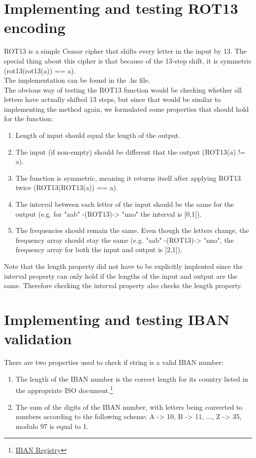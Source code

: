 \documentclass[a4paper]{article}
\begin{document}
\section{Implementing and testing ROT13 encoding}
ROT13 is a simple Ceasar cipher that shifts every letter in the input by 13. The special thing about this cipher is that because of the 13-step shift, it is symmetric (rot13(rot13(a)) == a).\\
The implementation can be found in the .hs file.\\
The obvious way of testing the ROT13 function would be checking whether all letters have actually shifted 13 steps, but since that would be similar to implementing the method again, we formulated some properties that should hold for the function:\\
\begin{enumerate}
\item Length of input should equal the length of the output.
\item The input (if non-empty) should be different that the output (ROT13(a) != a).
\item The function is symmetric, meaning it returns itself after applying ROT13 twice (ROT13(ROT13(a)) == a). 
\item The interval between each letter of the input should be the same for the output (e.g. for "aab" -(ROT13)-> "nno" the interval is [0,1]).
\item The frequencies should remain the same. Even though the letters change, the frequency array should stay the same (e.g. "aab" -(ROT13)-> "nno", the frequency array for both the input and output is [2,1]).
\end{enumerate}
Note that the length property did not have to be explicitly implented since the interval property can only hold if the lengths of the input and output are the same. Therefore checking the interval property also checks the length property.  

\section{Implementing and testing IBAN validation}
There are two properties used to check if string is a valid IBAN number:
\begin{enumerate}
\item The length of the IBAN number is the correct length for its country listed in the appropriate ISO document.\footnote{\href{https://www.swift.com/sites/default/files/resources/swift_standards_ibanregistry.pdf}{IBAN Registry}}
\item The sum of the digits of the IBAN number, with letters being converted to numbers according to the following scheme: A -> 10, B -> 11, ..., Z -> 35, modulo 97 is equal to 1.
\end{enumerate}
\end{document}

